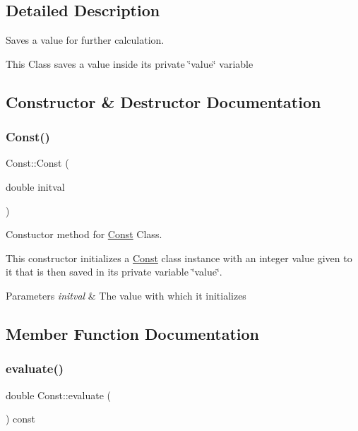 \subsection{Detailed Description}
Saves a value for further calculation. 

This Class saves a value inside its private \char`\"{}value\char`\"{} variable 

\subsection{Constructor \& Destructor Documentation}
\mbox{\label{class_const_a0d12dfb3f9b2ada576ce78d4914227ad}} 
\subsubsection{\texorpdfstring{Const()}{Const()}}
{\footnotesize\ttfamily Const\+::\+Const (\begin{DoxyParamCaption}\item[{double}]{initval }\end{DoxyParamCaption})}



Constuctor method for \hyperlink{class_const}{Const} Class. 

This constructor initializes a \hyperlink{class_const}{Const} class instance with an integer value given to it that is then saved in it\textquotesingle{}s private variable \char`\"{}value\char`\"{}.


\begin{DoxyParams}{Parameters}
{\em initval} & The value with which it initializes \\
\hline
\end{DoxyParams}


\subsection{Member Function Documentation}
\mbox{\label{class_const_a2f86d9af4cbc9dda466815c66360ba16}} 
\subsubsection{\texorpdfstring{evaluate()}{evaluate()}}
{\footnotesize\ttfamily double Const\+::evaluate (\begin{DoxyParamCaption}{ }\end{DoxyParamCaption}) const\hspace{0.3cm}{\ttfamily [virtual]}}



